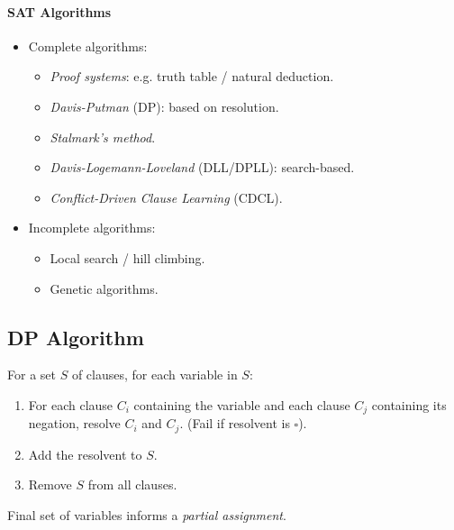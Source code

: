 \documentclass[twocolumn,english]{article}
\begin{document}
\paragraph{SAT Algorithms}
\begin{itemize}
\item Complete algorithms:
\begin{itemize}
\item \emph{Proof systems}: e.g. truth table / natural deduction.
\item \emph{Davis-Putman} (DP): based on resolution.
\item \emph{Stalmark's method}.
\item \emph{Davis-Logemann-Loveland} (DLL/DPLL): search-based.
\item \emph{Conflict-Driven Clause Learning} (CDCL).
\end{itemize}
\item Incomplete algorithms:
\begin{itemize}
\item Local search / hill climbing.
\item Genetic algorithms.
\end{itemize}
\end{itemize}

\subsection{DP Algorithm}

For a set $S$ of clauses, for each variable in $S$:
\begin{enumerate}
\item For each clause $C_{i}$ containing the variable and each clause $C_{j}$
containing its negation, resolve $C_{i}$ and $C_{j}$. (Fail if resolvent
is $\square$).
\item Add the resolvent to $S$.
\item Remove $S$ from all clauses.
\end{enumerate}
Final set of variables informs a \emph{partial assignment}.
\end{document}
